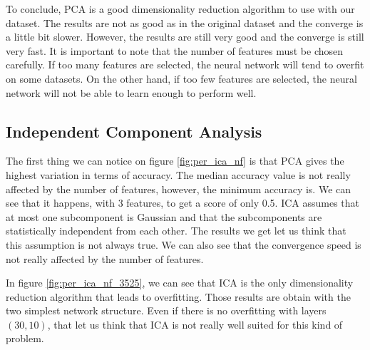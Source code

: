 \documentclass[twocolumn, 10pt]{article}
\begin{document}
			To conclude, PCA is a good dimensionality reduction algorithm to use with our dataset. The results are not as good as in the original dataset and the converge is a little bit slower. However, the results are still very good and the converge is still very fast. It is important to note that the number of features must be chosen carefully. If too many features are selected, the neural network will tend to overfit on some datasets. On the other hand, if too few features are selected, the neural network will not be able to learn enough to perform well.
		\subsection{Independent Component Analysis}
			The first thing we can notice on figure \ref{fig:per_ica_nf} is that PCA gives the highest variation in terms of accuracy. The median accuracy value is not really affected by the number of features, however, the minimum accuracy is. We can see that it happens, with 3 features, to get a score of only 0.5. ICA assumes that at most one subcomponent is Gaussian and that the subcomponents are statistically independent from each other. The results we get let us think that this assumption is not always true. We can also see that the convergence speed is not really affected by the number of features.

			In figure \ref{fig:per_ica_nf_3525}, we can see that ICA is the only dimensionality reduction algorithm that leads to overfitting. Those results are obtain with the two simplest network structure. Even if there is no overfitting with layers $(30, 10)$, that let us think that ICA is not really well suited for this kind of problem.
\end{document}
